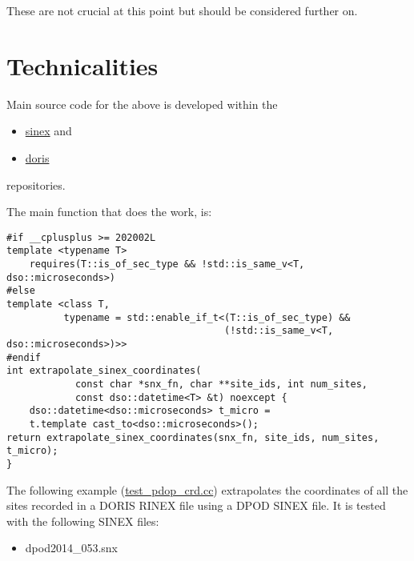 These are not crucial at this point but should be considered further on.

\section{Technicalities}

Main source code for the above is developed within the 
\begin{itemize}
    \item \href{https://github.com/xanthospap/libsinex}{sinex} and
    \item \href{https://github.com/xanthospap/doris}{doris}
\end{itemize}
repositories.

The main function that does the work, is:
\begin{lstlisting}
#if __cplusplus >= 202002L
template <typename T>
    requires(T::is_of_sec_type && !std::is_same_v<T, dso::microseconds>)
#else
template <class T,
          typename = std::enable_if_t<(T::is_of_sec_type) &&
                                      (!std::is_same_v<T, dso::microseconds>)>>
#endif
int extrapolate_sinex_coordinates(
            const char *snx_fn, char **site_ids, int num_sites,
            const dso::datetime<T> &t) noexcept {
    dso::datetime<dso::microseconds> t_micro =
    t.template cast_to<dso::microseconds>();
return extrapolate_sinex_coordinates(snx_fn, site_ids, num_sites, t_micro);
}
\end{lstlisting}

The following example (\href{https://github.com/xanthospap/doris/blob/main/test/test\_pdop\_crd.cc}{test\_pdop\_crd.cc}) 
extrapolates the coordinates of all the sites recorded in a DORIS RINEX file using a DPOD 
SINEX file. It is tested with the following SINEX files:
\begin{itemize}
    \item dpod2014\_053.snx
\end{itemize}

